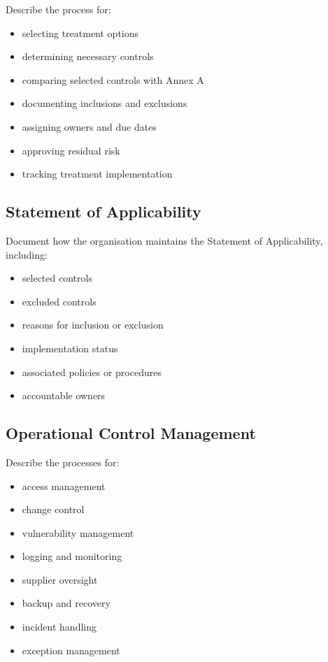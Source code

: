 \documentclass[
  letterpaper,
  DIV=11,
  numbers=noendperiod]{scrartcl}
\providecommand{\tightlist}{%
  \setlength{\itemsep}{0pt}\setlength{\parskip}{0pt}}
\begin{document}
Describe the process for:

\begin{itemize}
\tightlist
\item
  selecting treatment options
\item
  determining necessary controls
\item
  comparing selected controls with Annex A
\item
  documenting inclusions and exclusions
\item
  assigning owners and due dates
\item
  approving residual risk
\item
  tracking treatment implementation
\end{itemize}

\subsection{Statement of
Applicability}\label{statement-of-applicability}

Document how the organisation maintains the Statement of Applicability,
including:

\begin{itemize}
\tightlist
\item
  selected controls
\item
  excluded controls
\item
  reasons for inclusion or exclusion
\item
  implementation status
\item
  associated policies or procedures
\item
  accountable owners
\end{itemize}

\subsection{Operational Control
Management}\label{operational-control-management}

Describe the processes for:

\begin{itemize}
\tightlist
\item
  access management
\item
  change control
\item
  vulnerability management
\item
  logging and monitoring
\item
  supplier oversight
\item
  backup and recovery
\item
  incident handling
\item
  exception management
\end{itemize}
\end{document}
